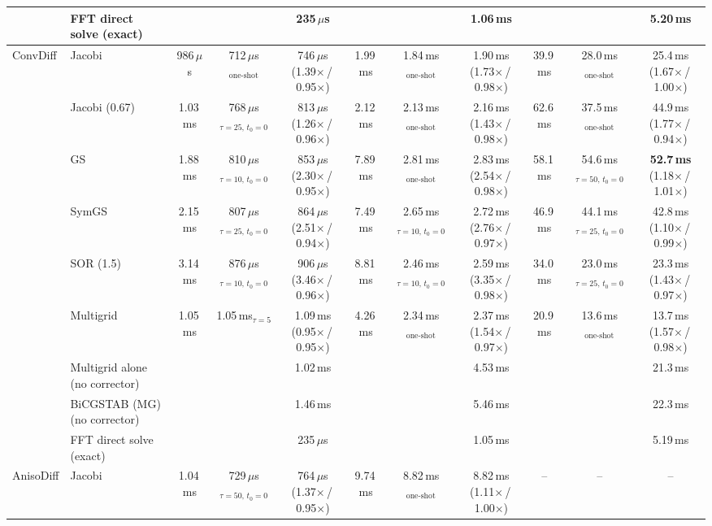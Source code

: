 {\begin{tabular}{llccccccccc}
 & FFT direct solve (exact) &  &  & 235\,$\mu$s &  &  & 1.06\,ms &  &  & 5.20\,ms \\
\midrule
ConvDiff & Jacobi & 986\,$\mu$s & 712\,$\mu$s$_{\text{one-shot}}$ & 746\,$\mu$s (1.39$\times$\,/\,0.95$\times$) & 1.99\,ms & 1.84\,ms$_{\text{one-shot}}$ & 1.90\,ms (1.73$\times$\,/\,0.98$\times$) & 39.9\,ms & 28.0\,ms$_{\text{one-shot}}$ & 25.4\,ms (1.67$\times$\,/\,1.00$\times$) \\
 & Jacobi (0.67) & 1.03\,ms & 768\,$\mu$s$_{\tau{=}25,\,t_0{=}0}$ & 813\,$\mu$s (1.26$\times$\,/\,0.96$\times$) & 2.12\,ms & 2.13\,ms$_{\text{one-shot}}$ & 2.16\,ms (1.43$\times$\,/\,0.98$\times$) & 62.6\,ms & 37.5\,ms$_{\text{one-shot}}$ & 44.9\,ms (1.77$\times$\,/\,0.94$\times$) \\
 & GS & 1.88\,ms & 810\,$\mu$s$_{\tau{=}10,\,t_0{=}0}$ & 853\,$\mu$s (2.30$\times$\,/\,0.95$\times$) & 7.89\,ms & 2.81\,ms$_{\text{one-shot}}$ & 2.83\,ms (2.54$\times$\,/\,0.98$\times$) & 58.1\,ms & 54.6\,ms$_{\tau{=}50,\,t_0{=}0}$ & \textbf{52.7\,ms} (1.18$\times$\,/\,1.01$\times$) \\
 & SymGS & 2.15\,ms & 807\,$\mu$s$_{\tau{=}25,\,t_0{=}0}$ & 864\,$\mu$s (2.51$\times$\,/\,0.94$\times$) & 7.49\,ms & 2.65\,ms$_{\tau{=}10,\,t_0{=}0}$ & 2.72\,ms (2.76$\times$\,/\,0.97$\times$) & 46.9\,ms & 44.1\,ms$_{\tau{=}25,\,t_0{=}0}$ & 42.8\,ms (1.10$\times$\,/\,0.99$\times$) \\
 & SOR (1.5) & 3.14\,ms & 876\,$\mu$s$_{\tau{=}10,\,t_0{=}0}$ & 906\,$\mu$s (3.46$\times$\,/\,0.96$\times$) & 8.81\,ms & 2.46\,ms$_{\tau{=}10,\,t_0{=}0}$ & 2.59\,ms (3.35$\times$\,/\,0.98$\times$) & 34.0\,ms & 23.0\,ms$_{\tau{=}25,\,t_0{=}0}$ & 23.3\,ms (1.43$\times$\,/\,0.97$\times$) \\
 & Multigrid & 1.05\,ms & 1.05\,ms$_{\tau{=}5}$ & 1.09\,ms (0.95$\times$\,/\,0.95$\times$) & 4.26\,ms & 2.34\,ms$_{\text{one-shot}}$ & 2.37\,ms (1.54$\times$\,/\,0.97$\times$) & 20.9\,ms & 13.6\,ms$_{\text{one-shot}}$ & 13.7\,ms (1.57$\times$\,/\,0.98$\times$) \\
 & Multigrid alone (no corrector) &  &  & 1.02\,ms &  &  & 4.53\,ms &  &  & 21.3\,ms \\
 & BiCGSTAB (MG) (no corrector) &  &  & 1.46\,ms &  &  & 5.46\,ms &  &  & 22.3\,ms \\
 & FFT direct solve (exact) &  &  & 235\,$\mu$s &  &  & 1.05\,ms &  &  & 5.19\,ms \\
\midrule
AnisoDiff & Jacobi & 1.04\,ms & 729\,$\mu$s$_{\tau{=}50,\,t_0{=}0}$ & 764\,$\mu$s (1.37$\times$\,/\,0.95$\times$) & 9.74\,ms & 8.82\,ms$_{\text{one-shot}}$ & 8.82\,ms (1.11$\times$\,/\,1.00$\times$) & -- & -- & -- \\

\end{tabular}}
